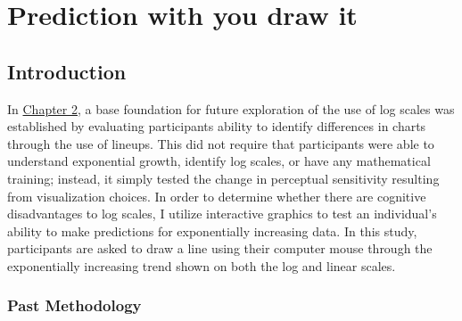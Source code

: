 \documentclass[print]{nuthesis}
\begin{document}
\hypertarget{youdrawit}{%
\chapter{Prediction with you draw it}\label{youdrawit}}

\hypertarget{introduction-1}{%
\section{Introduction}\label{introduction-1}}

In \protect\hyperlink{lineups}{Chapter 2}, a base foundation for future exploration of the use of log scales was established by evaluating participants ability to identify differences in charts through the use of lineups.
This did not require that participants were able to understand exponential growth, identify log scales, or have any mathematical training; instead, it simply tested the change in perceptual sensitivity resulting from visualization choices.
In order to determine whether there are cognitive disadvantages to log scales, I utilize interactive graphics to test an individual's ability to make predictions for exponentially increasing data. In this study, participants are asked to draw a line using their computer mouse through the exponentially increasing trend shown on both the log and linear scales.

\hypertarget{past-methodology}{%
\subsection{Past Methodology}\label{past-methodology}}
\end{document}
